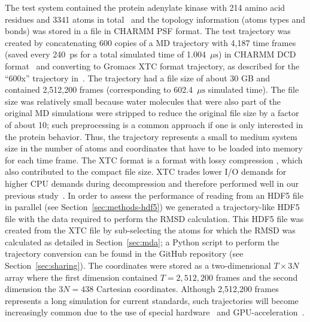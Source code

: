 The test system contained the protein adenylate kinase with 214 amino acid residues and 3341 atoms in total~\cite{Seyler:2014il} and the topology information (atoms types and bonds) was stored in a file in CHARMM PSF format.
The test trajectory was created by concatenating 600 copies of a MD trajectory with 4,187 time frames (saved every 240~ps for a total simulated time of 1.004~$\mu\text{s}$) in CHARMM DCD format~\cite{Seyler:2017aa} and converting to Gromacs XTC format trajectory, as described for the ``600x'' trajectory in~\citet{Khoshlessan:2017ab}.
The trajectory had a file size of about 30 GB and contained 2,512,200 frames (corresponding to 602.4~$\mu\text{s}$ simulated time).
The file size was relatively small because water molecules that were also part of the original MD simulations were stripped to reduce the original file size by a factor of about 10; such preprocessing is a common approach if one is only interested in the protein behavior.
Thus, the trajectory represents a small to medium system size in the number of atoms and coordinates that have to be loaded into memory for each time frame.
The XTC format is a format with lossy compression \cite{Lindahl01, Spangberg:2011zr}, which also contributed to the compact file size.
XTC trades lower I/O demands for higher CPU demands during decompression and therefore performed well in our previous study~\cite{Khoshlessan:2017ab}.
In order to assess the performance of reading from an HDF5 file in parallel (see Section~\ref{sec:methods-hdf5}) we generated a trajectory-like HDF5 file with the data required to perform the RMSD calculation.
This HDF5 file was created from the XTC file by sub-selecting the atoms for which the RMSD was calculated as detailed in Section~\ref{sec:mda}; a Python script to perform the trajectory conversion can be found in the GitHub repository (see Section~\ref{sec:sharing}).
The coordinates were stored as a two-dimensional $T \times 3N$ array where the first dimension contained $T=2,512,200$ frames and the second dimension the $3N = 438$ Cartesian coordinates.
Although 2,512,200 frames represents a long simulation for current standards, such trajectories will become increasingly common due to the use of special hardware~\cite{Shaw:2009ly, Shaw:2014aa} and GPU-acceleration~\cite{Salomon-Ferrer:2013cr, Glaser:2015ys, Abraham:2015aa}.

